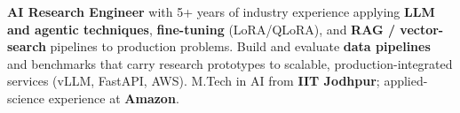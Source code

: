 \documentclass[letter,10pt]{article}
\begin{document}

\textbf{AI Research Engineer} with 5+ years of industry experience applying \textbf{LLM and agentic techniques}, \textbf{fine-tuning} (LoRA/QLoRA), and \textbf{RAG / vector-search} pipelines to production problems.
Build and evaluate \textbf{data pipelines} and benchmarks that carry research prototypes to scalable, production-integrated services (vLLM, FastAPI, AWS).
M.Tech in AI from \textbf{IIT Jodhpur}; applied-science experience at \textbf{Amazon}.
\end{document}

